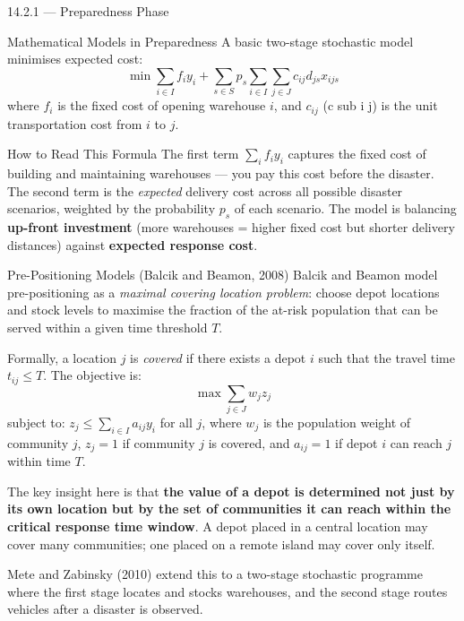 \documentclass[aspectratio=169,10pt]{beamer}
\begin{document}
\begin{frame}[allowframebreaks]{14.2.1 --- Preparedness Phase}
\begin{block}{Mathematical Models in Preparedness}
    A basic two-stage stochastic model minimises expected cost:
    \[
      \min \sum_{i \in I} f_i y_i
           + \sum_{s \in S} p_s \sum_{i \in I} \sum_{j \in J}
             c_{ij} d_{js} x_{ijs}
    \]
    where $f_i$ is the fixed cost of opening warehouse $i$, and
    $c_{ij}$ (c sub i j) is the unit transportation cost from $i$ to $j$.
  \end{block}

  \begin{alertblock}{How to Read This Formula}
    The first term $\sum_{i} f_i y_i$ captures the fixed cost of building
    and maintaining warehouses --- you pay this cost before the disaster.
    The second term is the \emph{expected} delivery cost across all
    possible disaster scenarios, weighted by the probability $p_s$ of
    each scenario.
    The model is balancing \textbf{up-front investment} (more warehouses
    = higher fixed cost but shorter delivery distances) against
    \textbf{expected response cost}.
  \end{alertblock}

  \framebreak

  \begin{block}{Pre-Positioning Models (Balcik and Beamon, 2008)}
    Balcik and Beamon model pre-positioning as a
    \emph{maximal covering location problem}: choose depot locations
    and stock levels to maximise the fraction of the at-risk population
    that can be served within a given time threshold $T$.

    Formally, a location $j$ is \emph{covered} if there exists a depot
    $i$ such that the travel time $t_{ij} \leq T$.
    The objective is:
    \[
      \max \sum_{j \in J} w_j z_j
    \]
    subject to: $z_j \leq \sum_{i \in I} a_{ij} y_i$ for all $j$,
    where $w_j$ is the population weight of community $j$,
    $z_j = 1$ if community $j$ is covered, and
    $a_{ij} = 1$ if depot $i$ can reach $j$ within time $T$.
  \end{block}

  The key insight here is that \textbf{the value of a depot is determined
  not just by its own location but by the set of communities it can
  reach within the critical response time window}.
  A depot placed in a central location may cover many communities;
  one placed on a remote island may cover only itself.

  \medskip
  Mete and Zabinsky (2010) extend this to a two-stage stochastic programme
  where the first stage locates and stocks warehouses, and the second stage
  routes vehicles after a disaster is observed.
\end{frame}
\end{document}
